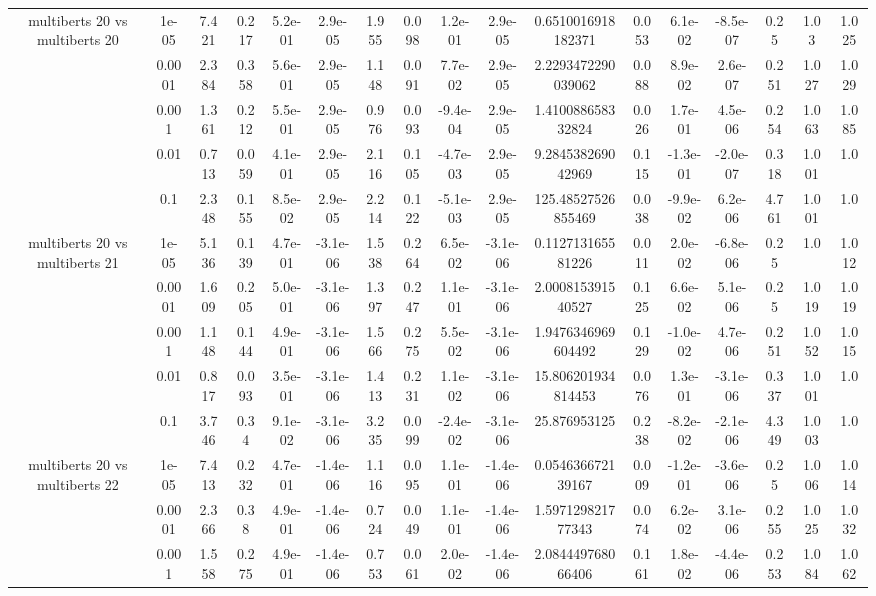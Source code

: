 \begin{tabular}{|c|c|c|c|c|c|c|c|c|c|c|c|c|c|c|c|c|}
\hline
\multirow{5}{*}{multiberts 20 vs multiberts 20} & 1e-05 & 7.421 & 0.217 & 5.2e-01 & 2.9e-05 & 1.955 & 0.098 & 1.2e-01 & 2.9e-05 & 0.6510016918182371 & 0.053 & 6.1e-02 & -8.5e-07 & 0.25 & 1.03 & 1.025 \\
 & 0.0001 & 2.384 & 0.358 & 5.6e-01 & 2.9e-05 & 1.148 & 0.091 & 7.7e-02 & 2.9e-05 & 2.2293472290039062 & 0.088 & 8.9e-02 & 2.6e-07 & 0.251 & 1.027 & 1.029 \\
 & 0.001 & 1.361 & 0.212 & 5.5e-01 & 2.9e-05 & 0.976 & 0.093 & -9.4e-04 & 2.9e-05 & 1.410088658332824 & 0.026 & 1.7e-01 & 4.5e-06 & 0.254 & 1.063 & 1.085 \\
 & 0.01 & 0.713 & 0.059 & 4.1e-01 & 2.9e-05 & 2.116 & 0.105 & -4.7e-03 & 2.9e-05 & 9.284538269042969 & 0.115 & -1.3e-01 & -2.0e-07 & 0.318 & 1.001 & 1.0 \\
 & 0.1 & 2.348 & 0.155 & 8.5e-02 & 2.9e-05 & 2.214 & 0.122 & -5.1e-03 & 2.9e-05 & 125.48527526855469 & 0.038 & -9.9e-02 & 6.2e-06 & 4.761 & 1.001 & 1.0 \\
\hline
\multirow{5}{*}{multiberts 20 vs multiberts 21} & 1e-05 & 5.136 & 0.139 & 4.7e-01 & -3.1e-06 & 1.538 & 0.264 & 6.5e-02 & -3.1e-06 & 0.112713165581226 & 0.011 & 2.0e-02 & -6.8e-06 & 0.25 & 1.0 & 1.012 \\
 & 0.0001 & 1.609 & 0.205 & 5.0e-01 & -3.1e-06 & 1.397 & 0.247 & 1.1e-01 & -3.1e-06 & 2.000815391540527 & 0.125 & 6.6e-02 & 5.1e-06 & 0.25 & 1.019 & 1.019 \\
 & 0.001 & 1.148 & 0.144 & 4.9e-01 & -3.1e-06 & 1.566 & 0.275 & 5.5e-02 & -3.1e-06 & 1.9476346969604492 & 0.129 & -1.0e-02 & 4.7e-06 & 0.251 & 1.052 & 1.015 \\
 & 0.01 & 0.817 & 0.093 & 3.5e-01 & -3.1e-06 & 1.413 & 0.231 & 1.1e-02 & -3.1e-06 & 15.806201934814453 & 0.076 & 1.3e-01 & -3.1e-06 & 0.337 & 1.001 & 1.0 \\
 & 0.1 & 3.746 & 0.34 & 9.1e-02 & -3.1e-06 & 3.235 & 0.099 & -2.4e-02 & -3.1e-06 & 25.876953125 & 0.238 & -8.2e-02 & -2.1e-06 & 4.349 & 1.003 & 1.0 \\
\hline
\multirow{5}{*}{multiberts 20 vs multiberts 22} & 1e-05 & 7.413 & 0.232 & 4.7e-01 & -1.4e-06 & 1.116 & 0.095 & 1.1e-01 & -1.4e-06 & 0.054636672139167 & 0.009 & -1.2e-01 & -3.6e-06 & 0.25 & 1.006 & 1.014 \\
 & 0.0001 & 2.366 & 0.38 & 4.9e-01 & -1.4e-06 & 0.724 & 0.049 & 1.1e-01 & -1.4e-06 & 1.597129821777343 & 0.074 & 6.2e-02 & 3.1e-06 & 0.255 & 1.025 & 1.032 \\
 & 0.001 & 1.558 & 0.275 & 4.9e-01 & -1.4e-06 & 0.753 & 0.061 & 2.0e-02 & -1.4e-06 & 2.084449768066406 & 0.161 & 1.8e-02 & -4.4e-06 & 0.253 & 1.084 & 1.062 \\

\end{tabular}
